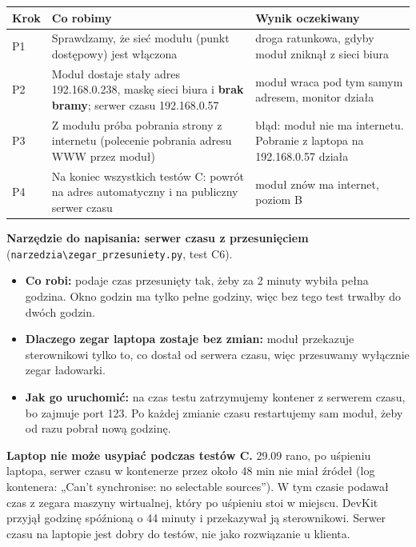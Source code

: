 \documentclass[11pt,a4paper]{article}
\begin{document}
\begin{longtable}{>{\raggedright\arraybackslash}p{3.00cm}>{\raggedright\arraybackslash}p{7.11cm}>{\raggedright\arraybackslash}p{5.17cm}}
\toprule
\rowcolor{apteallight}\textbf{Krok} & \textbf{Co robimy} & \textbf{Wynik oczekiwany} \\
\midrule\endhead
\bottomrule\endfoot
P1 & Sprawdzamy, że sieć modułu (punkt dostępowy) jest włączona & droga ratunkowa, gdyby moduł zniknął z sieci biura \\
P2 & Moduł dostaje stały adres 192.168.0.238, maskę sieci biura i \textbf{brak bramy}; serwer czasu 192.168.0.57 & moduł wraca pod tym samym adresem, monitor działa \\
P3 & Z modułu próba pobrania strony z internetu (polecenie pobrania adresu WWW przez moduł) & błąd: moduł nie ma internetu. Pobranie z laptopa na 192.168.0.57 działa \\
P4 & Na koniec wszystkich testów C: powrót na adres automatyczny i na publiczny serwer czasu & moduł znów ma internet, poziom B \\
\end{longtable}

\textbf{Narzędzie do napisania: serwer czasu z przesunięciem} (\texttt{narzedzia\textbackslash{}zegar\_\allowbreak{}przesuniety.\allowbreak{}py}, test C6).

\begin{itemize}
\item \textbf{Co robi:} podaje czas przesunięty tak, żeby za 2 minuty wybiła pełna godzina. Okno godzin ma tylko pełne godziny, więc bez tego test trwałby do dwóch godzin.
\item \textbf{Dlaczego zegar laptopa zostaje bez zmian:} moduł przekazuje sterownikowi tylko to, co dostał od serwera czasu, więc przesuwamy wyłącznie zegar ładowarki.
\item \textbf{Jak go uruchomić:} na czas testu zatrzymujemy kontener z serwerem czasu, bo zajmuje port 123. Po każdej zmianie czasu restartujemy sam moduł, żeby od razu pobrał nową godzinę.
\end{itemize}

\textbf{Laptop nie może usypiać podczas testów C.} 29.09 rano, po uśpieniu laptopa, serwer czasu w kontenerze przez około 48 min nie miał źródeł (log kontenera: „Can't synchronise: no selectable sources”). W tym czasie podawał czas z zegara maszyny wirtualnej, który po uśpieniu stoi w miejscu. DevKit przyjął godzinę spóźnioną o 44 minuty i przekazywał ją sterownikowi. Serwer czasu na laptopie jest dobry do testów, nie jako rozwiązanie u klienta.
\end{document}
